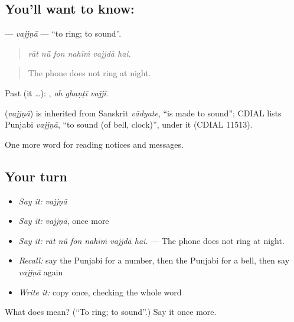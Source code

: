 \subsection*{You'll want to know: }
\textbf{} — \emph{vajjṇā} — \textquotedblleft{}to ring; to sound\textquotedblright{}.

\begin{quote}
     
\end{quote}

\begin{quote}
\emph{rāt nū̃ fon nahīṁ vajjdā hai.}
\end{quote}

\begin{quote}
The phone does not ring at night.
\end{quote}

Past (it …):   , \emph{oh ghaṇṭī vajjī}.

\begin{cousinweb}
\textbf{} (\emph{vajjṇā}) is inherited from Sanskrit \emph{vādyate}, \textquotedblleft{}is made to sound\textquotedblright{}; CDIAL lists Punjabi \emph{vajjṇā}, \textquotedblleft{}to sound (of bell, clock)\textquotedblright{}, under it (CDIAL 11513).
\end{cousinweb}

\begin{grammarlens}[title={What you've built}]
One more word for reading notices and messages.
\end{grammarlens}

\subsection*{Your turn}
\begin{itemize}
\raggedright
  \item \emph{Say it:} \emph{vajjṇā}
  \item \emph{Say it:} \emph{vajjṇā}, once more
  \item \emph{Say it:} \emph{rāt nū̃ fon nahīṁ vajjdā hai.} — The phone does not ring at night.
  \item \emph{Recall:} say the Punjabi for a number, then the Punjabi for a bell, then say \emph{vajjṇā} again
  \item \emph{Write it:} copy \textbf{} once, checking the whole word
\end{itemize}

\begin{tcolorbox}[breakable,colback=teal!4,colframe=teal!35!black,title={Before you move on}]
What does  mean? (\textquotedblleft{}To ring; to sound\textquotedblright{}.) Say it once more.
\end{tcolorbox}
